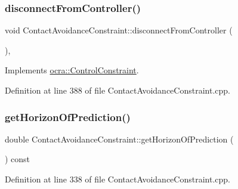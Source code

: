 \hypertarget{classocra_1_1ContactAvoidanceConstraint_a884358568ff7f5510d26ff96915a4d8c}{}\label{classocra_1_1ContactAvoidanceConstraint_a884358568ff7f5510d26ff96915a4d8c} 
\subsubsection{\texorpdfstring{disconnect\+From\+Controller()}{disconnectFromController()}}
{\footnotesize\ttfamily void Contact\+Avoidance\+Constraint\+::disconnect\+From\+Controller (\begin{DoxyParamCaption}{ }\end{DoxyParamCaption})\hspace{0.3cm}{\ttfamily [protected]}, {\ttfamily [virtual]}}



Implements \hyperlink{classocra_1_1ControlConstraint_adbd15b36773c775a06a0b7bde46ec799}{ocra\+::\+Control\+Constraint}.



Definition at line 388 of file Contact\+Avoidance\+Constraint.\+cpp.

\hypertarget{classocra_1_1ContactAvoidanceConstraint_a1282e8f163c4b53da93b435cdd16501f}{}\label{classocra_1_1ContactAvoidanceConstraint_a1282e8f163c4b53da93b435cdd16501f} 
\subsubsection{\texorpdfstring{get\+Horizon\+Of\+Prediction()}{getHorizonOfPrediction()}}
{\footnotesize\ttfamily double Contact\+Avoidance\+Constraint\+::get\+Horizon\+Of\+Prediction (\begin{DoxyParamCaption}{ }\end{DoxyParamCaption}) const}



Definition at line 338 of file Contact\+Avoidance\+Constraint.\+cpp.

